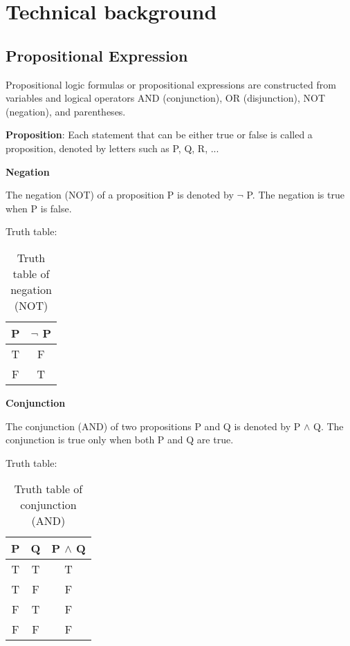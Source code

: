 \section{Technical background}
\subsection{Propositional Expression}
Propositional logic formulas or propositional expressions are constructed from variables
and logical operators AND (conjunction), OR (disjunction), NOT (negation), and
parentheses.

\textbf{Proposition}: Each statement that can be either true or false is called a proposition,
denoted by letters such as P, Q, R, ...

\textbf{Negation}

The negation (NOT) of a proposition P is denoted by $\lnot$ P. The negation
is true when P is false.

Truth table:
\begin{table}[H]
    \centering
    \begin{tabular}{|c|c|}
        \hline
        P & $\lnot$ P \\
        \hline
        T & F         \\
        F & T         \\
        \hline
    \end{tabular}
    \caption{Truth table of negation (NOT)}
    \label{tab:truth_table_negation}
\end{table}

\textbf{Conjunction}

The conjunction (AND) of two propositions P and Q is denoted by P
$\land$ Q. The conjunction is true only when both P and Q are true.

Truth table:
\begin{table}[H]
    \centering
    \begin{tabular}{|c|c|c|}
        \hline
        P & Q & P $\land$ Q \\
        \hline
        T & T & T           \\
        T & F & F           \\
        F & T & F           \\
        F & F & F           \\
        \hline
    \end{tabular}
    \caption{Truth table of conjunction (AND)}
    \label{tab:truth_table_conjunction}
\end{table}

